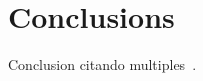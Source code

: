 \documentclass[../thesis/thesis.tex]{subfiles}
\begin{document}
\section{Conclusions}\label{sec:conclusion}

Conclusion citando multiples~\cite{hadash2018estimate,kour2014real}.

\lipsum[8-9]
\end{document}
